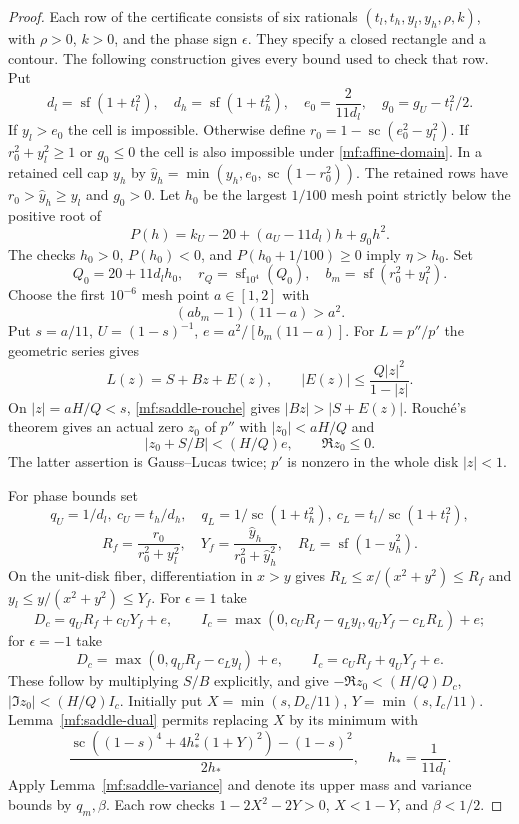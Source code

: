 \begin{proof}
Each row of the certificate consists of six rationals
$(t_l,t_h,y_l,y_h,\rho,k)$, with $\rho>0$, $k>0$, and the
phase sign $\epsilon$.
They specify a closed rectangle and a contour. The following
construction gives every bound used to check that row.
Put
\[
 d_l=\operatorname{sf}(1+t_l^2),\quad
 d_h=\operatorname{sf}(1+t_h^2),\quad
 e_0=\frac2{11d_l},\quad
 g_0=g_U-t_l^2/2.
\]
If $y_l>e_0$ the cell is impossible. Otherwise define
$r_0=1-\operatorname{sc}(e_0^2-y_l^2)$.
If $r_0^2+y_l^2\ge1$ or $g_0\le0$ the cell is also impossible
under \eqref{mf:affine-domain}. In a retained cell
cap $y_h$ by
$\widehat y_h=\min(y_h,e_0,\operatorname{sc}(1-r_0^2))$.
The retained rows have $r_0>\widehat y_h\ge y_l$ and $g_0>0$.
Let $h_0$ be the largest $1/100$ mesh point strictly below the
positive root of
\[
 P(h)=k_U-20+(a_U-11d_l)h+g_0h^2.
\]
The checks $h_0>0$, $P(h_0)<0$, and $P(h_0+1/100)\ge0$
imply $\eta>h_0$. Set
\[
 Q_0=20+11d_lh_0,\quad r_Q=\operatorname{sf}_{10^4}(Q_0),\quad
 b_m=\operatorname{sf}(r_0^2+y_l^2).
\]
Choose the first $10^{-6}$ mesh point $a\in[1,2]$ with
\begin{equation}\label{mf:saddle-rouche}
 (ab_m-1)(11-a)>a^2.
\end{equation}
Put $s=a/11$, $U=(1-s)^{-1}$, $e=a^2/[b_m(11-a)]$.
For $L=p''/p'$ the geometric series gives
\[
 L(z)=S+Bz+E(z),\qquad |E(z)|\le\frac{Q|z|^2}{1-|z|}.
\]
On $|z|=aH/Q<s$, \eqref{mf:saddle-rouche} gives
$|Bz|>|S+E(z)|$. Rouch\'e's theorem gives an actual zero $z_0$
of $p''$ with $|z_0|<aH/Q$ and
\[
 |z_0+S/B|<(H/Q)e,\qquad \Re z_0\le0.
\]
The latter assertion is Gauss--Lucas twice; $p'$ is nonzero
in the whole disk $|z|<1$.

For phase bounds set
\[
 q_U=1/d_l,\ c_U=t_h/d_h,\quad
 q_L=1/\operatorname{sc}(1+t_h^2),\
 c_L=t_l/\operatorname{sc}(1+t_l^2),
\]
\[
 R_f=\frac{r_0}{r_0^2+y_l^2},\quad
 Y_f=\frac{\widehat y_h}{r_0^2+\widehat y_h^2},\quad
 R_L=\operatorname{sf}(1-\widehat y_h^2).
\]
On the unit-disk fiber, differentiation in $x>y$ gives
$R_L\le x/(x^2+y^2)\le R_f$ and
$y_l\le y/(x^2+y^2)\le Y_f$. For $\epsilon=1$ take
\[
 D_c=q_UR_f+c_UY_f+e,\qquad
 I_c=\max(0,c_UR_f-q_Ly_l,q_UY_f-c_LR_L)+e;
\]
for $\epsilon=-1$ take
\[
 D_c=\max(0,q_UR_f-c_Ly_l)+e,\qquad
 I_c=c_UR_f+q_UY_f+e.
\]
These follow by multiplying $S/B$ explicitly, and give
$-\Re z_0<(H/Q)D_c$, $|\Im z_0|<(H/Q)I_c$.
Initially put $X=\min(s,D_c/11)$, $Y=\min(s,I_c/11)$.
Lemma~\ref{mf:saddle-dual} permits replacing $X$ by its minimum
with
\[
 \frac{\operatorname{sc}((1-s)^4+4h_*^2(1+Y)^2)-(1-s)^2}
      {2h_*},\qquad h_*=\frac1{11d_l}.
\]
Apply Lemma~\ref{mf:saddle-variance} and denote its upper
mass and variance bounds by $q_m,\beta$. Each row checks
$1-2X^2-2Y>0$, $X<1-Y$, and $\beta<1/2$.


\end{proof}
